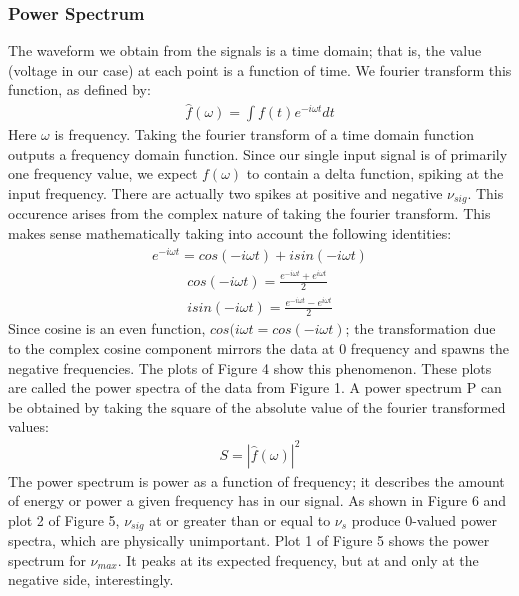 \documentclass[12pt]{article}
\begin{document}
\subsubsection{Power Spectrum}
The waveform we obtain from the signals is a time domain; that is, the
value (voltage in our case) at each point is a function of
time. We fourier transform this function, as defined by:
\begin{align}\hat{f}(\omega) = \int f(t) e^{-i\omega{t}} dt\end{align}
Here $\omega$ is frequency. Taking the fourier transform of a time domain
function outputs a frequency domain function. Since our single input
signal is of primarily one frequency value, we expect $f(\omega)$ to
contain a delta function, spiking at the input frequency. There are
actually two spikes at positive and negative $\nu_{sig}$. This occurence
arises from the complex nature of taking the fourier transform. This
makes sense mathematically taking into account the following identities:
\begin{align}e^{-i\omega{t}} = cos(-i\omega{t}) +
isin(-i\omega{t})\end{align}
\begin{align}cos(-i\omega{t}) = \frac{e^{-i\omega{t}}+e^{i\omega{t}}}{2}
  \\ isin(-i\omega{t}) =
  \frac{e^{-i\omega{t}}-e^{i\omega{t}}}{2}\end{align}
Since cosine is an even function, $cos(i\omega{t} = cos(-i\omega{t})$; the
transformation due to the complex cosine component mirrors the data at 0 
frequency and spawns the negative frequencies. The plots of Figure 4
show this phenomenon. These plots are called the power spectra of the
data from Figure 1. A power spectrum P can be obtained by taking the
square of the absolute value of the fourier transformed values:
\begin{align}S = |{\hat{f}(\omega)}|^2\end{align}
The power spectrum is power as a function of frequency; it describes the
amount of energy or power a given frequency has in our signal. As shown
in Figure 6 and plot 2 of Figure 5, $\nu_{sig}$ at or greater than or equal to $\nu_{s}$
produce 0-valued power spectra, which are physically unimportant. Plot
1 of Figure 5 shows the power spectrum for $\nu_{max}$. It peaks at its
expected frequency, but at and only at the negative side, interestingly. 
\end{document}
